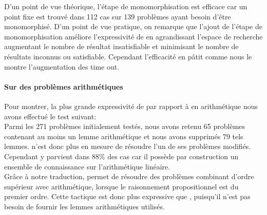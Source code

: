 D'un point de vue théorique, l'étape de monomorphisation est efficace car un point fixe est trouvé dans 112 cas sur 139 problèmes ayant besoin d'être monomorphisé.
D'un point de vue pratique, on remarque que l'ajout de l'étape de monomorphisation améliore l'expressivité de \beagletac en agrandissant l'espace de recherche augmentant le nombre de résultat insatisfiable et minimisant le nombre de résultats inconnus ou satisfiable. Cependant l'efficacité en pâtit comme nous le montre l'augmentation des time out.


\paragraph {Sur des problèmes arithmétiques}
Pour montrer, la plus grande expressivité de \beagletac par rapport à \metistac en arithmétique nous avons effectué le test suivant:
\\Parmi les 271 problèmes initialement testés, nous avons retenu 65 problèmes contenant au moins un lemme arithmétique et nous avons supprimés 79 tels lemmes. \metistac n'est donc plus en mesure de résoudre l'un de ses problèmes modifiés. Cependant \beagletac y parvient dans 88\% des cas car il possède par construction un ensemble de connaissance sur l'arithmétique linéaire.
\\Grâce à notre traduction, \beagletac permet de résoudre des problèmes
combinant d'ordre supérieur avec arithmétique, lorsque le raisonnement
propositionnel est du premier ordre. Cette tactique est donc plus
expressive que \metistac, puisqu'il n'est pas besoin de fournir les
lemmes arithmétiques utilisés.

